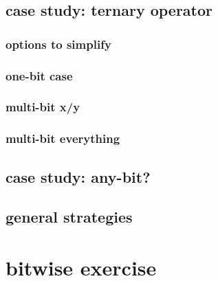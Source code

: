 

\subsection{case study: ternary operator}


\subsubsection{options to simplify}


\subsubsection{one-bit case}


\subsubsection{multi-bit x/y}


\subsubsection{multi-bit everything}



\subsection{case study: any-bit?}



\subsection{general strategies}



\section{bitwise exercise}



